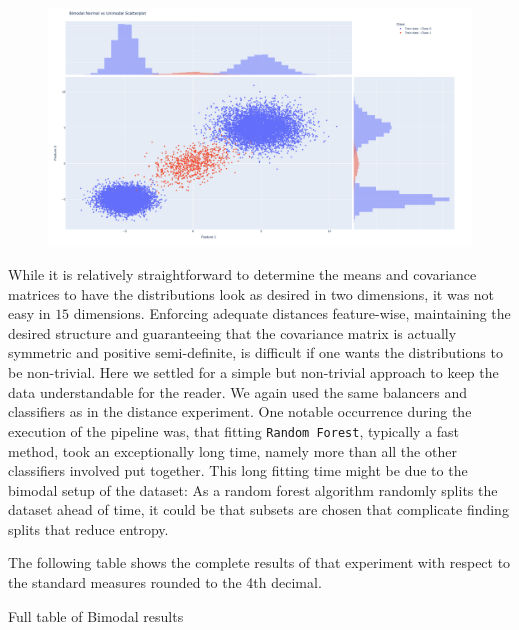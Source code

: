 \begin{figure}[H]
  	\centering
  	\includegraphics[width=0.75\linewidth]{assets/data_vis/Bimodal_Maj_Unimodal_Min.png}
  	\label{fig:Mode_Experiment}
\end{figure}

While it is relatively straightforward to determine the means and covariance matrices to have the distributions look as desired in two dimensions, 
it was not easy in $15$ dimensions. 
Enforcing adequate distances feature-wise, maintaining the desired structure and guaranteeing that the covariance matrix is actually symmetric and positive semi-definite,
is difficult if one wants the distributions to be non-trivial. 
Here we settled for a simple but non-trivial approach to keep the data understandable for the reader.
We again used the same balancers and classifiers as in the distance experiment. 
One notable occurrence during the execution of the pipeline was, that fitting \texttt{Random Forest}, typically a fast method, took an exceptionally long time,
namely more than all the other classifiers involved put together.  
This long fitting time might be due to the bimodal setup of the dataset: As a random forest algorithm randomly splits the dataset ahead of time, it could be that subsets 
are chosen that complicate finding splits that reduce entropy.

The following table shows the complete results of that experiment with respect to the standard measures rounded to the 4th decimal.
\begin{table}[H]
\centering
\footnotesize
\caption{Full table of Bimodal results}
\end{table}

